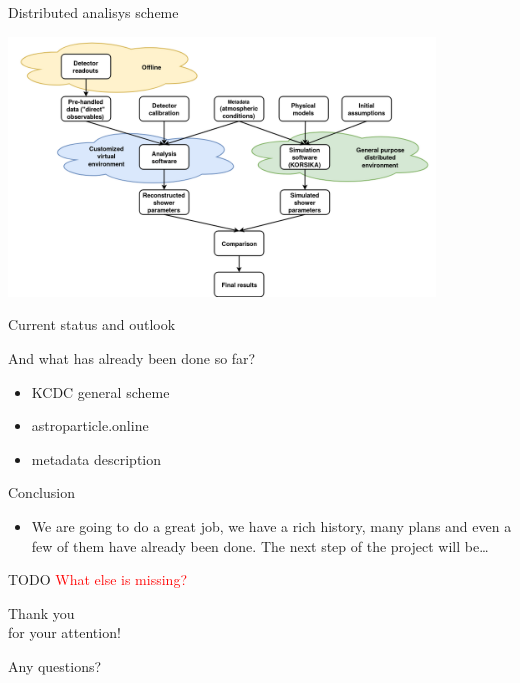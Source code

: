 \documentclass[18pt]{beamer}
\begin{document}
\begin{frame}{Distributed analisys scheme}
\begin{center}
\includegraphics[width=0.85\textwidth]{pics/KCDC_workflow_f1.png}
\end{center}
\end{frame}

\begin{frame}{Current status and outlook}
\begin{block}{And what has already been done so far?}
  \begin{itemize}
    \item KCDC general scheme
    \item astroparticle.online
    \item metadata description
  \end{itemize}
\end{block}
\begin{block}{Conclusion}
  \begin{itemize}
    \item We are going to do a great job, we have a rich history, many plans and even a few of them have already been done. The next step of the project will be\ldots
  \end{itemize}
\end{block}
\end{frame}

\begin{frame}{TODO}
\textcolor{red}{What else is missing?}
\end{frame}

\begin{frame}{}
\Huge
\begin{center}
\textcolor{kit-green100}{Thank you\\for your attention!}

\vspace{1em}
\Large
Any questions?
\end{center}
\end{frame}
\end{document}
